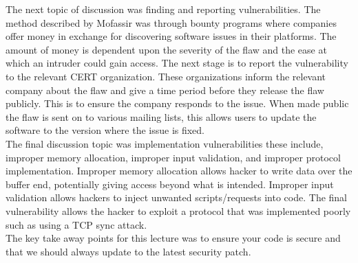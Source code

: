 \documentclass{article}
\begin{document}
The next topic of discussion was finding and reporting vulnerabilities. The method described by 
Mofassir was through bounty programs where companies offer money in exchange for discovering
software issues in their platforms. The amount of money is dependent upon the severity of the flaw
and the ease at which an intruder could gain access. The next stage is to report the
vulnerability to the relevant CERT organization. These organizations inform the relevant company
about the flaw and give a time period before they release the flaw publicly. This is to ensure the
company responds to the issue. When made public the flaw is sent on to various mailing lists, this
allows users to update the software to the version where the issue is fixed.\\

The final discussion topic was implementation vulnerabilities these include, improper memory
allocation, improper input validation, and improper protocol implementation. Improper memory
allocation allows hacker to write data over the buffer end, potentially giving access beyond what
is intended. Improper input validation allows hackers to inject unwanted scripts/requests into
code. The final vulnerability allows the hacker to exploit a protocol that was implemented poorly
such as using a TCP sync attack.\\

The key take away points for this lecture was to ensure your code is secure and that we should
always update to the latest security patch.
\end{document}
